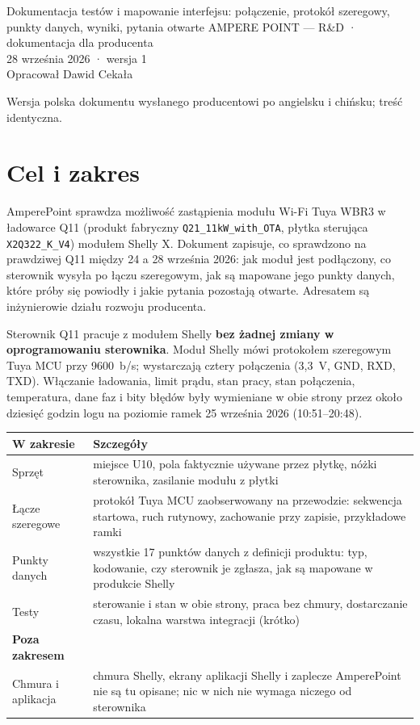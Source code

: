 \documentclass[11pt,a4paper]{article}
\begin{document}
%
{Dokumentacja testów i mapowanie interfejsu: połączenie, protokół szeregowy, punkty danych, wyniki, pytania otwarte}%
{AMPERE POINT — R\&D · dokumentacja dla producenta\\28 września 2026 · wersja 1\\Opracował Dawid Cekała}

{\small\color{apmuted}Wersja polska dokumentu wysłanego producentowi po angielsku i chińsku; treść identyczna.}

\section{Cel i zakres}

AmperePoint sprawdza możliwość zastąpienia modułu Wi-Fi Tuya WBR3 w ładowarce Q11 (produkt fabryczny \texttt{Q21\_11kW\_with\_OTA}, płytka sterująca \texttt{X2Q322\_K\_V4}) modułem Shelly X. Dokument zapisuje, co sprawdzono na prawdziwej Q11 między 24 a 28 września 2026: jak moduł jest podłączony, co sterownik wysyła po łączu szeregowym, jak są mapowane jego punkty danych, które próby się powiodły i jakie pytania pozostają otwarte. Adresatem są inżynierowie działu rozwoju producenta.

\begin{apgreenb}
Sterownik Q11 pracuje z modułem Shelly \textbf{bez żadnej zmiany w oprogramowaniu sterownika}. Moduł Shelly mówi protokołem szeregowym Tuya MCU przy 9600~b/s; wystarczają cztery połączenia (3,3~V, GND, RXD, TXD). Włączanie ładowania, limit prądu, stan pracy, stan połączenia, temperatura, dane faz i bity błędów były wymieniane w obie strony przez około dziesięć godzin logu na poziomie ramek 25 września 2026 (10:51--20:48).
\end{apgreenb}

\begin{longtable}{>{\raggedright\arraybackslash}p{3.2cm}>{\raggedright\arraybackslash}p{12.9cm}}
\toprule
\rowcolor{aphead}\textbf{W zakresie} & \textbf{Szczegóły} \\
\midrule\endhead
\bottomrule\endfoot
Sprzęt & miejsce U10, pola faktycznie używane przez płytkę, nóżki sterownika, zasilanie modułu z płytki \\
Łącze szeregowe & protokół Tuya MCU zaobserwowany na przewodzie: sekwencja startowa, ruch rutynowy, zachowanie przy zapisie, przykładowe ramki \\
Punkty danych & wszystkie 17 punktów danych z definicji produktu: typ, kodowanie, czy sterownik je zgłasza, jak są mapowane w produkcie Shelly \\
Testy & sterowanie i stan w obie strony, praca bez chmury, dostarczanie czasu, lokalna warstwa integracji (krótko) \\
\rowcolor{aphead}\textbf{Poza zakresem} & \\
Chmura i aplikacja & chmura Shelly, ekrany aplikacji Shelly i zaplecze AmperePoint nie są tu opisane; nic w nich nie wymaga niczego od sterownika \\
\end{longtable}
\end{document}
